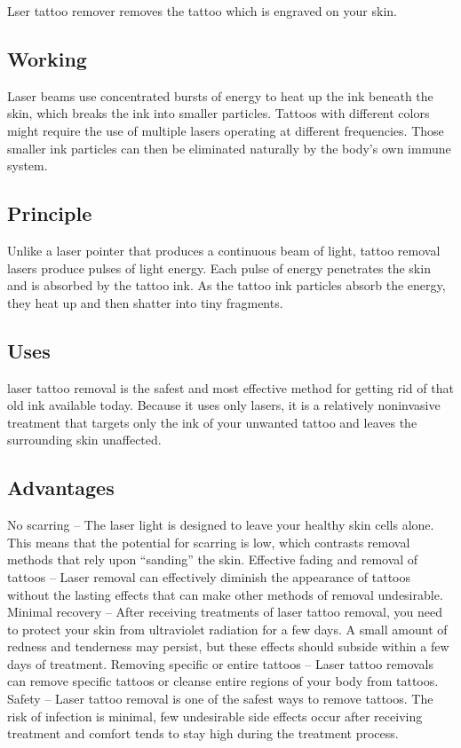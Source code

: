 \documentclass[12pt]{article}
\begin{document}
Lser tattoo remover removes the tattoo which is engraved on your skin.



\subsection{Working}
Laser beams use concentrated bursts of energy to heat up the ink beneath the skin, which breaks the ink into smaller particles. Tattoos with different colors might require the use of multiple lasers operating at different frequencies. Those smaller ink particles can then be eliminated naturally by the body’s own immune system.

\subsection{Principle}

Unlike a laser pointer that produces a continuous beam of light, tattoo removal lasers produce pulses of light energy. Each pulse of energy penetrates the skin and is absorbed by the tattoo ink. As the tattoo ink particles absorb the energy, they heat up and then shatter into tiny fragments.
\subsection{Uses}

laser tattoo removal is the safest and most effective method for getting rid of that old ink available today. Because it uses only lasers, it is a relatively noninvasive treatment that targets only the ink of your unwanted tattoo and leaves the surrounding skin unaffected.

\subsection{Advantages}
No scarring – The laser light is designed to leave your healthy skin cells alone. This means that the potential for scarring is low, which contrasts removal methods that rely upon “sanding” the skin.
Effective fading and removal of tattoos – Laser removal can effectively diminish the appearance of tattoos without the lasting effects that can make other methods of removal undesirable.
Minimal recovery – After receiving treatments of laser tattoo removal, you need to protect your skin from ultraviolet radiation for a few days. A small amount of redness and tenderness may persist, but these effects should subside within a few days of treatment.
Removing specific or entire tattoos – Laser tattoo removals can remove specific tattoos or cleanse entire regions of your body from tattoos.
Safety – Laser tattoo removal is one of the safest ways to remove tattoos. The risk of infection is minimal, few undesirable side effects occur after receiving treatment and comfort tends to stay high during the treatment process.
\end{document}
